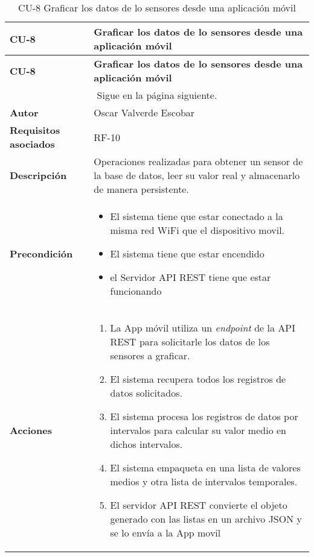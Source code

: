 \begin{longtable}{ p{} p{} }
    \caption{CU-8 Graficar los datos de lo sensores desde una aplicación móvil}\\
    \hline
    \textbf{CU-8}    & \textbf{Graficar los datos de lo sensores desde una aplicación móvil}\\
    \hline
    \endfirsthead
    \hline
    \textbf{CU-8}    & \textbf{Graficar los datos de lo sensores desde una aplicación móvil}\\
    \hline
    \endhead
        \hline
        \multicolumn{2}{c}{Sigue en la página siguiente.}
        \endfoot
        \hline
        \endlastfoot
    \textbf{Versión}              & 1.0    \\
    \textbf{Autor}                & Oscar Valverde Escobar \\
    \textbf{Requisitos asociados} & RF-10\\
    \textbf{Descripción}          & Operaciones realizadas para obtener un sensor de la base de datos, leer su valor real y almacenarlo de manera persistente.\\
    \textbf{Precondición}         & 
        \begin{itemize}
            \item El sistema tiene que estar conectado a la misma red WiFi que el dispositivo movil.
            \item El sistema tiene que estar encendido
            \item el Servidor API REST tiene que estar funcionando
        \end{itemize}\\
    \textbf{Acciones}             &
    \begin{enumerate}
        \def\labelenumi{\arabic{enumi}.}
        \tightlist
        \item La App móvil utiliza un \textit{endpoint} de la API REST para solicitarle los datos de los sensores a graficar.
        \item El sistema recupera todos los registros de datos solicitados.
        \item El sistema procesa los registros de datos por intervalos para calcular su valor medio en dichos intervalos.
        \item El sistema empaqueta en una lista de valores medios y otra lista de intervalos temporales.
        \item El servidor API REST convierte el objeto generado con las listas en un archivo JSON y se lo envía a la App movil

\end{enumerate}
\end{longtable}
